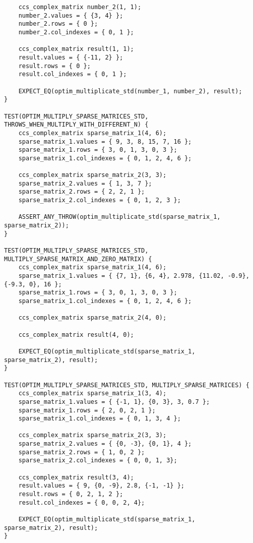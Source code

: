 \documentclass{report}
\begin{document}
\begin{itemize}
\begin{itemize}
\begin{lstlisting}
    ccs_complex_matrix number_2(1, 1);
    number_2.values = { {3, 4} };
    number_2.rows = { 0 };
    number_2.col_indexes = { 0, 1 };

    ccs_complex_matrix result(1, 1);
    result.values = { {-11, 2} };
    result.rows = { 0 };
    result.col_indexes = { 0, 1 };

    EXPECT_EQ(optim_multiplicate_std(number_1, number_2), result);
}

TEST(OPTIM_MULTIPLY_SPARSE_MATRICES_STD, THROWS_WHEN_MULTIPLY_WITH_DIFFERENT_N) {
    ccs_complex_matrix sparse_matrix_1(4, 6);
    sparse_matrix_1.values = { 9, 3, 8, 15, 7, 16 };
    sparse_matrix_1.rows = { 3, 0, 1, 3, 0, 3 };
    sparse_matrix_1.col_indexes = { 0, 1, 2, 4, 6 };

    ccs_complex_matrix sparse_matrix_2(3, 3);
    sparse_matrix_2.values = { 1, 3, 7 };
    sparse_matrix_2.rows = { 2, 2, 1 };
    sparse_matrix_2.col_indexes = { 0, 1, 2, 3 };

    ASSERT_ANY_THROW(optim_multiplicate_std(sparse_matrix_1, sparse_matrix_2));
}

TEST(OPTIM_MULTIPLY_SPARSE_MATRICES_STD, MULTIPLY_SPARSE_MATRIX_AND_ZERO_MATRIX) {
    ccs_complex_matrix sparse_matrix_1(4, 6);
    sparse_matrix_1.values = { {7, 1}, {6, 4}, 2.978, {11.02, -0.9}, {-9.3, 0}, 16 };
    sparse_matrix_1.rows = { 3, 0, 1, 3, 0, 3 };
    sparse_matrix_1.col_indexes = { 0, 1, 2, 4, 6 };

    ccs_complex_matrix sparse_matrix_2(4, 0);

    ccs_complex_matrix result(4, 0);

    EXPECT_EQ(optim_multiplicate_std(sparse_matrix_1, sparse_matrix_2), result);
}

TEST(OPTIM_MULTIPLY_SPARSE_MATRICES_STD, MULTIPLY_SPARSE_MATRICES) {
    ccs_complex_matrix sparse_matrix_1(3, 4);
    sparse_matrix_1.values = { {-1, 1}, {0, 3}, 3, 0.7 };
    sparse_matrix_1.rows = { 2, 0, 2, 1 };
    sparse_matrix_1.col_indexes = { 0, 1, 3, 4 };

    ccs_complex_matrix sparse_matrix_2(3, 3);
    sparse_matrix_2.values = { {0, -3}, {0, 1}, 4 };
    sparse_matrix_2.rows = { 1, 0, 2 };
    sparse_matrix_2.col_indexes = { 0, 0, 1, 3};

    ccs_complex_matrix result(3, 4);
    result.values = { 9, {0, -9}, 2.8, {-1, -1} };
    result.rows = { 0, 2, 1, 2 };
    result.col_indexes = { 0, 0, 2, 4};

    EXPECT_EQ(optim_multiplicate_std(sparse_matrix_1, sparse_matrix_2), result);
}


\end{lstlisting}
\end{itemize}
\end{itemize}
\end{document}
